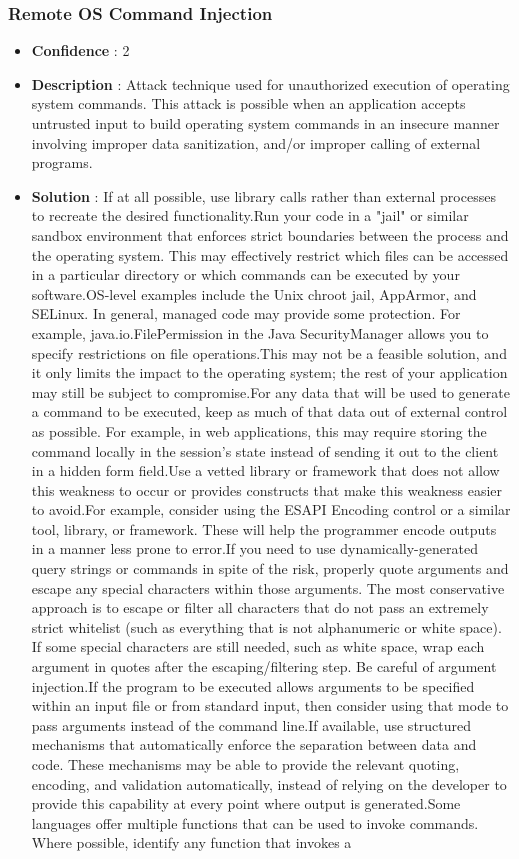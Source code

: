 \documentclass[10pt]{article}
\begin{document}
\subsubsection{Remote OS Command Injection}
\begin{itemize}
\item[] \textbf{Confidence} : 2
\item[] \textbf{Description} : Attack technique used for unauthorized execution of operating system commands. This attack is possible when an application accepts untrusted input to build operating system commands in an insecure manner involving improper data sanitization, and/or improper calling of external programs.
\item[] \textbf{Solution} :  If at all possible, use library calls rather than external processes to recreate the desired functionality.Run your code in a "jail" or similar sandbox environment that enforces strict boundaries between the process and the operating system. This may effectively restrict which files can be accessed in a particular directory or which commands can be executed by your software.OS-level examples include the Unix chroot jail, AppArmor, and SELinux. In general, managed code may provide some protection. For example, java.io.FilePermission in the Java SecurityManager allows you to specify restrictions on file operations.This may not be a feasible solution, and it only limits the impact to the operating system; the rest of your application may still be subject to compromise.For any data that will be used to generate a command to be executed, keep as much of that data out of external control as possible. For example, in web applications, this may require storing the command locally in the session's state instead of sending it out to the client in a hidden form field.Use a vetted library or framework that does not allow this weakness to occur or provides constructs that make this weakness easier to avoid.For example, consider using the ESAPI Encoding control or a similar tool, library, or framework. These will help the programmer encode outputs in a manner less prone to error.If you need to use dynamically-generated query strings or commands in spite of the risk, properly quote arguments and escape any special characters within those arguments. The most conservative approach is to escape or filter all characters that do not pass an extremely strict whitelist (such as everything that is not alphanumeric or white space). If some special characters are still needed, such as white space, wrap each argument in quotes after the escaping/filtering step. Be careful of argument injection.If the program to be executed allows arguments to be specified within an input file or from standard input, then consider using that mode to pass arguments instead of the command line.If available, use structured mechanisms that automatically enforce the separation between data and code. These mechanisms may be able to provide the relevant quoting, encoding, and validation automatically, instead of relying on the developer to provide this capability at every point where output is generated.Some languages offer multiple functions that can be used to invoke commands. Where possible, identify any function that invokes a 
\end{itemize}
\end{document}
